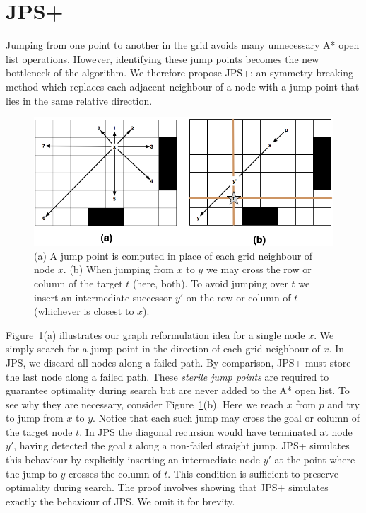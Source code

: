 \section{JPS+}
Jumping from one point to another in the grid
avoids many unnecessary A* open list operations. However, identifying 
these jump points becomes the new bottleneck of the algorithm. 
We therefore propose JPS+: an symmetry-breaking method which replaces
each adjacent neighbour of a node with a jump point that lies in the 
same relative direction.

\begin{figure}[tb]
       \begin{center}
		   \includegraphics[width=0.95\columnwidth]
			{chapter_jps/diagrams/preproc.png}
       \end{center}
	\vspace{-3pt}
       \caption{(a) A jump point is computed in place of each grid neighbour of node $x$.
		(b) When jumping from $x$ to $y$ we may cross the row or column of the target $t$ (here, both). 
To avoid jumping over $t$ we insert an intermediate successor $y'$ on the row or column of $t$ (whichever is closest to $x$).}

       \label{fig:preproc}
\end{figure}

Figure~\ref{fig:preproc}(a) illustrates our graph reformulation idea for a 
single node $x$. We simply search for a jump point in the direction
of each grid neighbour of $x$. In JPS, we discard all nodes along a failed
path. By comparison, JPS+ must store the last node along a failed path.
These \emph{sterile jump points} are required 
to guarantee optimality during search but are never added to the A* open list.
To see why they are necessary, consider Figure~\ref{fig:preproc}(b).
Here we reach $x$ from $p$ and try to jump from $x$ to $y$. 
Notice that each such jump may cross the goal or column of the target node
$t$. In JPS the diagonal recursion would have terminated at node $y'$, having detected
the goal $t$ along a non-failed straight jump.
JPS+ simulates this behaviour by explicitly inserting an intermediate node $y'$ 
at the point where the jump to $y$ crosses the column of $t$.
This condition is sufficient to preserve optimality during search. The proof
involves showing that JPS+ simulates exactly the behaviour of JPS. We omit it 
for brevity.

